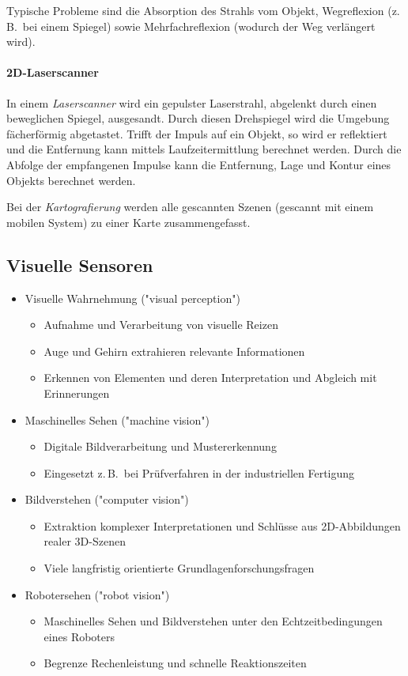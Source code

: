 \documentclass[a4paper, 11pt, accentcolor = tud3b]{tudreport}
\newcommand{\zB}{z.\,B.~}
\begin{document}
						Typische Probleme sind die Absorption des Strahls vom Objekt, Wegreflexion (\zB bei einem Spiegel) sowie Mehrfachreflexion (wodurch der Weg verlängert wird).

					\paragraph{2D-Laserscanner}
						In einem \emph{Laserscanner} wird ein gepulster Laserstrahl, abgelenkt durch einen beweglichen Spiegel, ausgesandt. Durch diesen Drehspiegel wird die Umgebung fächerförmig abgetastet. Trifft der Impuls auf ein Objekt, so wird er reflektiert und die Entfernung kann mittels Laufzeitermittlung berechnet werden. Durch die Abfolge der empfangenen Impulse kann die Entfernung, Lage und Kontur eines Objekts berechnet werden.
						
						Bei der \emph{Kartografierung} werden alle gescannten Szenen (gescannt mit einem mobilen System) zu einer Karte zusammengefasst.

			\subsection{Visuelle Sensoren}
				\begin{itemize}
					\item Visuelle Wahrnehmung ("visual perception")
						\begin{itemize}
							\item Aufnahme und Verarbeitung von visuelle Reizen
							\item Auge und Gehirn extrahieren relevante Informationen
							\item Erkennen von Elementen und deren Interpretation und Abgleich mit Erinnerungen
						\end{itemize}
					\item Maschinelles Sehen ("machine vision")
						\begin{itemize}
							\item Digitale Bildverarbeitung und Mustererkennung
							\item Eingesetzt \zB bei Prüfverfahren in der industriellen Fertigung
						\end{itemize}
					\item Bildverstehen ("computer vision")
						\begin{itemize}
							\item Extraktion komplexer Interpretationen und Schlüsse aus 2D-Abbildungen realer 3D-Szenen
							\item Viele langfristig orientierte Grundlagenforschungsfragen
						\end{itemize}
					\item Robotersehen ("robot vision")
						\begin{itemize}
							\item Maschinelles Sehen und Bildverstehen unter den Echtzeitbedingungen eines Roboters
							\item Begrenze Rechenleistung und schnelle Reaktionszeiten
						\end{itemize}
				\end{itemize}
			
\end{document}
